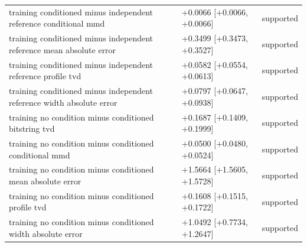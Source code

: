 \begin{table}[p]
\begin{tabular}{@{}p{}p{}p{}@{}}
training conditioned minus independent reference conditional mmd & +0.0066 [+0.0066, +0.0066] & supported \\
training conditioned minus independent reference mean absolute error & +0.3499 [+0.3473, +0.3527] & supported \\
training conditioned minus independent reference profile tvd & +0.0582 [+0.0554, +0.0613] & supported \\
training conditioned minus independent reference width absolute error & +0.0797 [+0.0647, +0.0938] & supported \\
training no condition minus conditioned bitstring tvd & +0.1687 [+0.1409, +0.1999] & supported \\
training no condition minus conditioned conditional mmd & +0.0500 [+0.0480, +0.0524] & supported \\
training no condition minus conditioned mean absolute error & +1.5664 [+1.5605, +1.5728] & supported \\
training no condition minus conditioned profile tvd & +0.1608 [+0.1515, +0.1722] & supported \\
training no condition minus conditioned width absolute error & +1.0492 [+0.7734, +1.2647] & supported \\
\bottomrule
\end{tabular}
\end{table}
\clearpage
